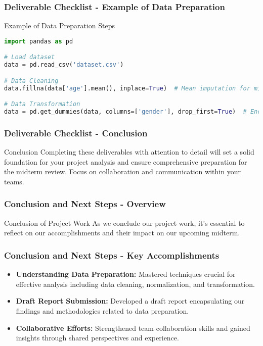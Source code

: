 \documentclass[aspectratio=169]{beamer}
\begin{document}
\begin{frame}[fragile]
    \frametitle{Deliverable Checklist - Example of Data Preparation}
    \begin{block}{Example of Data Preparation Steps}
        \begin{lstlisting}[language=Python]
import pandas as pd

# Load dataset
data = pd.read_csv('dataset.csv')

# Data Cleaning
data.fillna(data['age'].mean(), inplace=True)  # Mean imputation for missing age values

# Data Transformation
data = pd.get_dummies(data, columns=['gender'], drop_first=True)  # Encoding categorical variable
        \end{lstlisting}
    \end{block}
\end{frame}

\begin{frame}[fragile]
    \frametitle{Deliverable Checklist - Conclusion}
    \begin{block}{Conclusion}
        Completing these deliverables with attention to detail will set a solid foundation for your project analysis and ensure comprehensive preparation for the midterm review. Focus on collaboration and communication within your teams.
    \end{block}
\end{frame}

\begin{frame}[fragile]
    \frametitle{Conclusion and Next Steps - Overview}
    \begin{block}{Conclusion of Project Work}
        As we conclude our project work, it's essential to reflect on our accomplishments and their impact on our upcoming midterm.
    \end{block}
\end{frame}

\begin{frame}[fragile]
    \frametitle{Conclusion and Next Steps - Key Accomplishments}
    \begin{itemize}
        \item \textbf{Understanding Data Preparation:} Mastered techniques crucial for effective analysis including data cleaning, normalization, and transformation.
        \item \textbf{Draft Report Submission:} Developed a draft report encapsulating our findings and methodologies related to data preparation.
        \item \textbf{Collaborative Efforts:} Strengthened team collaboration skills and gained insights through shared perspectives and experience.
    \end{itemize}
\end{frame}
\end{document}
